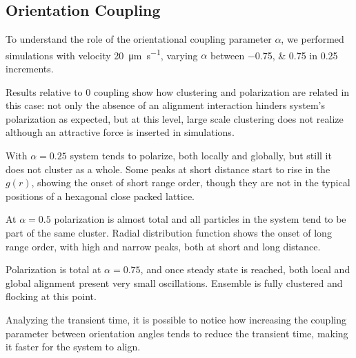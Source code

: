 \documentclass[../../master_thesis_np.tex]{subfiles}
\begin{document}
		\subsection{Orientation Coupling}
		To understand the role of the orientational coupling parameter $\alpha$, we performed simulations with velocity \SI{20}{\um\per\second}, varying $\alpha$ between \numlist{-0.75; 0.75} in \num{0.25} increments. 
		
		Results relative to \num{0} coupling show how clustering and polarization are related in this case: not only the absence of an alignment interaction hinders system's polarization as expected, but at this level, large scale clustering does not realize although an attractive force is inserted in simulations. 
		
		With $\alpha = 0.25$ system tends to polarize, both locally and globally, but still it does not cluster as a whole. 
		Some peaks at short distance start to rise in the $g(r)$, showing the onset of short range order, though they are not in the typical positions of a hexagonal close packed lattice. 
		
		At $\alpha = 0.5$ polarization is almost total and all particles in the system tend to be part of the same cluster. 
		Radial distribution function shows the onset of long range order, with high and narrow peaks, both at short and long distance.
		
		Polarization is total at $\alpha = 0.75$, and once steady state is reached, both local and global alignment present very small oscillations. 
		Ensemble is fully clustered and flocking at this point.
		
		Analyzing the transient time, it is possible to notice how increasing the coupling parameter between orientation angles tends to reduce the transient time, making it faster for the system to align.

\end{document}
